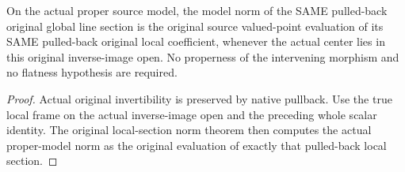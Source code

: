\begin{theorem}
\label{thm:fc-original-section-pullback-model-norm}
\leanok
{}
On the actual proper source model, the model norm of the SAME pulled-back
original global line section is the original source valued-point evaluation
of its SAME pulled-back original local coefficient, whenever the actual
center lies in this original inverse-image open.  No properness of the
intervening morphism and no flatness hypothesis are required.
\end{theorem}
\begin{proof}
Actual original invertibility is preserved by native pullback.  Use the
true local frame on the actual inverse-image open and the preceding whole
scalar identity.  The original local-section norm theorem then computes
the actual proper-model norm as the original evaluation of exactly that
pulled-back local section.
\end{proof}

